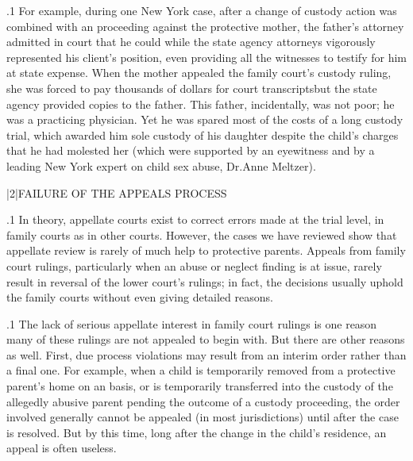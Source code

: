 \documentclass[11pt, twoside]{article}
\begin{document}
{\p.1{%
For example, during one New York case, after a change of custody
action was combined with an  proceeding against
the protective mother, the father’s attorney admitted in court that he
could  while the state agency attorneys vigorously represented his client’s position, even providing all the witnesses
to testify for him at state expense. When the mother appealed the family court’s custody ruling, she was forced to pay thousands of dollars for
court transcripts\mdash{}but the state agency provided copies to the father.
This father, incidentally, was not poor; he was a practicing physician. Yet
he was spared most of the costs of a long custody trial, which awarded
him sole custody of his daughter despite the child’s charges that he had
molested her (which were supported by an eyewitness and by a leading
New York expert on child sex abuse, Dr.\@ Anne Meltzer).
}%


\s|2|{FAILURE OF THE APPEALS PROCESS}

\p.1{%
In theory, appellate courts exist to correct errors made at the trial level,
in family courts as in other courts. However, the cases we have reviewed
show that appellate review is rarely of much help to protective parents.
Appeals from family court rulings, particularly when an abuse or neglect
finding is at issue, rarely result in reversal of the lower court’s rulings; in
fact, the decisions usually uphold the family courts without even giving
detailed reasons.
}%

\p.1{%
The lack of serious appellate interest in family court rulings is one reason many of these rulings are not appealed to begin with. But there are
other reasons as well. First, due process violations may result from an
interim order rather than a final one. For example, when a child is temporarily removed from a protective parent’s home on an 
basis, or is temporarily transferred into the custody of the allegedly abusive parent pending the outcome of a custody proceeding, the order
involved generally cannot be appealed (in most jurisdictions) until after
the case is resolved. But by this time, long after the change in the child’s
residence, an appeal is often useless.
}%

}
\end{document}
